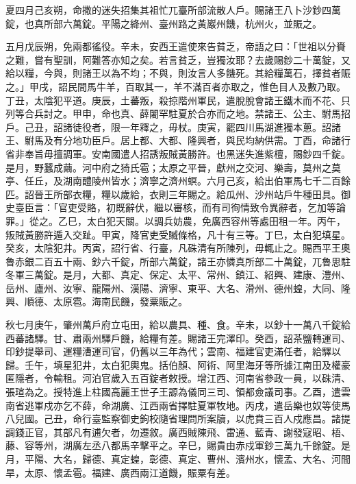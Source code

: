 \begin{pinyinscope}
 夏四月己亥朔，命撒的迷失招集其祖忙兀臺所部流散人戶。賜諸王八卜沙鈔四萬錠，也真所部六萬錠。平陽之絳州、臺州路之黃巖州饑，杭州火，並賑之。



 五月戊辰朔，免兩都徭役。辛未，安西王遣使來告貧乏，帝語之曰：「世祖以分賚之難，嘗有聖訓，阿難答亦知之矣。若言貧乏，豈獨汝耶？去歲賜鈔二十萬錠，又給以糧，今與，則諸王以為不均；不與，則汝言人多饑死。其給糧萬石，擇貧者賑之。」甲戌，詔民間馬牛羊，百取其一，羊不滿百者亦取之，惟色目人及數乃取。丁丑，太陰犯平道。庚辰，土蕃叛，殺掠階州軍民，遣脫脫會諸王鐵木而不花、只列等合兵討之。甲申，命也真、薛闍罕駐夏於合亦而之地。禁諸王、公主、駙馬招戶。己丑，詔諸徒役者，限一年釋之，毋杖。庚寅，罷四川馬湖進獨本蔥。詔諸王、駙馬及有分地功臣戶。居上都、大都、隆興者，與民均納供需。丁酉，命諸行省非奉旨毋擅調軍。安南國遣人招誘叛賊黃勝許。也黑迷失進紫檀，賜鈔四千錠。是月，野蠶成繭。河中府之猗氏雹；太原之平晉，獻州之交河、樂壽，莫州之莫亭、任丘，及湖南醴陵州皆水；濟寧之濟州螟。六月己亥，給出伯軍馬七千二百餘匹。詔晉王所部衣糧，糧以歲給，衣則三年賜之。給瓜州、沙州站戶牛種田具。御史臺臣言：「官吏受賂，初既辭伏，繼以審核，而有司徇情致令異辭者，乞加等論罪。」從之。乙巳，太白犯天關。以調兵妨農，免廣西容州等處田租一年。丙午，叛賊黃勝許遁入交趾。甲寅，降官吏受贓條格，凡十有三等。丁巳，太白犯填星。癸亥，太陰犯井。丙寅，詔行省、行臺，凡硃清有所陳列，毋輒止之。賜西平王奧魯赤銀二百五十兩、鈔六千錠，所部六萬錠，諸王亦憐真所部二十萬錠，兀魯思駐冬軍三萬錠。是月，大都、真定、保定、太平、常州、鎮江、紹興、建康、澧州、岳州、廬州、汝寧、龍陽州、漢陽、濟寧、東平、大名、滑州、德州蝗，大同、隆興、順德、太原雹。海南民饑，發粟賑之。



 秋七月庚午，肇州萬戶府立屯田，給以農具、種、食。辛未，以鈔十一萬八千錠給西蕃諸驛。甘、肅兩州驛戶饑，給糧有差。賜諸王完澤印。癸酉，詔茶鹽轉運司、印鈔提舉司、運糧漕運司官，仍舊以三年為代；雲南、福建官吏滿任者，給驛以歸。壬午，填星犯井，太白犯輿鬼。括伯顏、阿術、阿里海牙等所據江南田及權豪匿隱者，令輸租。河泊官歲入五百錠者敕授。增江西、河南省參政一員，以硃清、張瑄為之。授特進上柱國高麗王世子王謜為儀同三司、領都僉議司事。乙酉，遣雲南省逃軍戍亦乞不薛，命湖廣、江西兩省擇駐夏軍牧地。丙戌，遣岳樂也奴等使馬八兒國。己丑，命行臺監察御史鉤校隨省理問所案牘，以虎賁三百人戍應昌。諸提調錢正官，其部凡有逋欠者，勿遷敘。廣西賊陳飛、雷通、藍青、謝發寇昭、梧、藤、容等州，湖廣左丞八都馬辛擊平之。辛巳，賜貴由赤戍軍鈔三萬九千餘錠。是月，平陽、大名，歸德、真定蝗，彰德、真定、曹州、濱州水，懷孟、大名、河間旱，太原、懷孟雹。福建、廣西兩江道饑，賑粟有差。




\end{pinyinscope}
